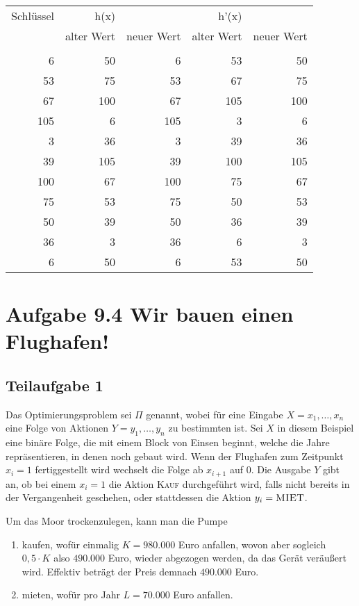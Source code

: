 \documentclass[a4paper, fontsize=10pt]{scrartcl}
\begin{document}
\begin{center}
    \begin{tabular}{r|rr|rr}
    Schlüssel & h(x) && h'(x)\\
     & alter Wert & neuer Wert & alter Wert & neuer Wert\\
     \hline\\
     6&50&6&53&50\\
     53&75&53&67&75\\
     67&100&67&105&100\\
     105&6&105&3&6\\
     3&36&3&39&36\\
     39&105&39&100&105\\
     100&67&100&75&67\\
     75&53&75&50&53\\
     50&39&50&36&39\\
     36&3&36&6&3\\
     6&50&6&53&50
     
    \end{tabular}
\end{center}
    

\section*{Aufgabe 9.4 Wir bauen einen Flughafen!}

\subsection*{Teilaufgabe 1}
Das Optimierungsproblem sei $\Pi$ genannt, wobei für eine Eingabe $X=x_1,\dots, x_n$ eine Folge von Aktionen $Y=y_1,\dots,y_n$ zu bestimmten ist. Sei $X$ in diesem Beispiel eine binäre Folge, die mit einem Block von Einsen beginnt, welche die Jahre repräsentieren, in denen noch gebaut wird. Wenn der Flughafen zum Zeitpunkt $x_i=1$ fertiggestellt wird wechselt die Folge ab $x_{i+1}$ auf $0$. Die Ausgabe $Y$ gibt an, ob bei einem $x_i=1$ die Aktion \textsc{Kauf} durchgeführt wird, falls nicht bereits in der Vergangenheit geschehen, oder stattdessen die Aktion $y_i=\textrm{\textsc{MIET}}$. \smallskip

Um das Moor trockenzulegen, kann man die Pumpe
  \begin{enumerate}
  \item kaufen, wofür einmalig $K= 980.000$ Euro anfallen, wovon aber sogleich $0,5\cdot K$ also $490.000$ Euro, wieder abgezogen werden, da das Gerät veräußert wird. Effektiv beträgt der Preis demnach $490.000$ Euro.
  \item mieten, wofür pro Jahr $L=70.000$ Euro anfallen.
  \end{enumerate} \smallskip
  
\end{document}
